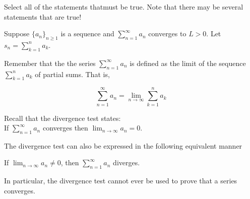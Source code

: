 \documentclass{ximera}
\author{Jim Talamo and Jason Miller}
\begin{document}
\begin{exercise}


Select all of the statements thatmust be true.  Note that there may be several statements that are true! 

 Suppose $\displaystyle\{a_n\}_{n \geq 1}$ is a sequence and $\displaystyle \sum^{\infty}_{n= 1} a_n$ converges to $L>0$.  Let $s_n =\displaystyle  \sum^n_{k=1} a_k$.

\begin{selectAll}
\end{selectAll}

\begin{hint}
Remember that the the series $\sum^{\infty}_{n=1} a_n$ is defined as the limit of the sequence $\sum^{n}_{k=1} a_k$ of partial sums. That is, 

\[
\sum^{\infty}_{n=1} a_n = \lim_{n \to \infty} \sum^n_{k=1} a_k
\]
\end{hint}


\begin{hint}
Recall that the divergence test states: \\
If $\sum^{\infty}_{n=1} a_n $ converges then $\lim_{n \to \infty} a_n=0$. 

The divergence test can also be expressed in the following equivalent manner

If $\lim_{n \to \infty} a_n \neq 0$, then $\sum^{\infty}_{n=1} a_n$ diverges. 

In particular, the divergence test cannot ever be used to prove that a series converges.
\end{hint}

\end{exercise}
\end{document}

